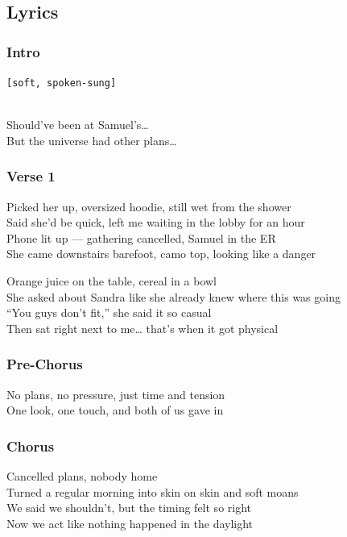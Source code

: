 \subsection{Lyrics}\label{lyrics-40}

\subsubsection{Intro}\label{intro-3}

\texttt{{[}soft,\ spoken-sung{]}}\strut \\
Should've been at Samuel's\ldots{}\\
But the universe had other plans\ldots{}

\subsubsection{Verse 1}\label{verse-1-29}

Picked her up, oversized hoodie, still wet from the shower\\
Said she'd be quick, left me waiting in the lobby for an hour\\
Phone lit up --- gathering cancelled, Samuel in the ER\\
She came downstairs barefoot, camo top, looking like a danger

Orange juice on the table, cereal in a bowl\\
She asked about Sandra like she already knew where this was going\\
``You guys don't fit,'' she said it so casual\\
Then sat right next to me\ldots{} that's when it got physical

\subsubsection{Pre-Chorus}\label{pre-chorus-70}

No plans, no pressure, just time and tension\\
One look, one touch, and both of us gave in

\subsubsection{Chorus}\label{chorus-82}

Cancelled plans, nobody home\\
Turned a regular morning into skin on skin and soft moans\\
We said we shouldn't, but the timing felt so right\\
Now we act like nothing happened in the daylight

